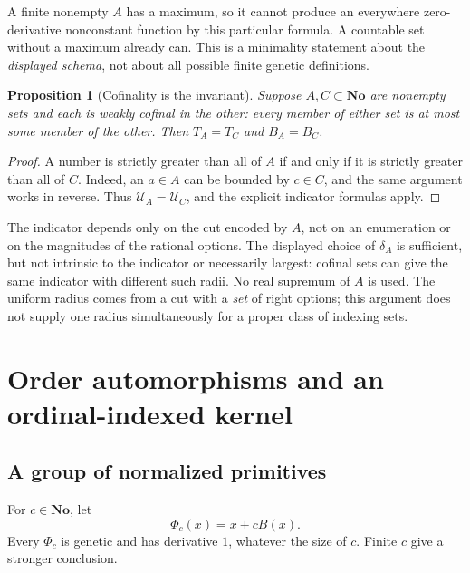 \documentclass[11pt,letterpaper]{article}
\numberwithin{equation}{section}
\newtheorem{proposition}[theorem]{Proposition}
\theoremstyle{definition}
\theoremstyle{remark}
\newcommand{\No}{\mathbf{No}}
\newcommand{\U}{\mathcal{U}}
\begin{document}
A finite nonempty $A$ has a maximum, so it cannot produce an everywhere
zero-derivative nonconstant function by this particular formula. A
countable set without a maximum already can. This is a minimality
statement about the \emph{displayed schema}, not about all possible
finite genetic definitions.

\begin{proposition}[Cofinality is the invariant]
Suppose $A,C\subset\No$ are nonempty sets and each is weakly cofinal in
the other: every member of either set is at most some member of the other.
Then $T_A=T_C$ and $B_A=B_C$.
\end{proposition}
\begin{proof}
A number is strictly greater than all of $A$ if and only if it is strictly
greater than all of $C$. Indeed, an $a\in A$ can be bounded by $c\in C$,
and the same argument works in reverse. Thus $\U_A=\U_C$, and the
explicit indicator formulas apply.
\end{proof}

The indicator depends only on the cut encoded by $A$, not on an enumeration
or on the magnitudes of the rational options. The displayed choice of
$\delta_A$ is sufficient, but not intrinsic to the indicator or necessarily
largest: cofinal sets can give the same indicator with different such radii. No real supremum of
$A$ is used. The uniform radius comes from a cut with a \emph{set} of right
options; this argument does not supply one radius simultaneously for a
proper class of indexing sets.

\section{Order automorphisms and an ordinal-indexed kernel}\label{sec:extensions}
\subsection{A group of normalized primitives}
For $c\in\No$, let
\begin{equation}\label{eq:Fc}
 \Phi_c(x)=x+cB(x).
\end{equation}
Every $\Phi_c$ is genetic and has derivative $1$, whatever the size of $c$.
Finite $c$ give a stronger conclusion.
\end{document}
